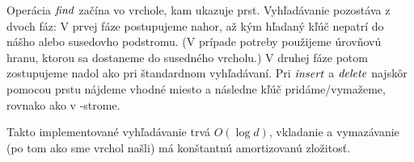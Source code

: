Operácia $\mathop{\mathit{find}}$ začína vo vrchole, kam ukazuje prst. Vyhľadávanie pozostáva z dvoch
fáz: V prvej fáze postupujeme nahor, až kým hľadaný kľúč nepatrí do nášho alebo susedovho podstromu.
(V prípade potreby použijeme úrovňovú hranu, ktorou sa dostaneme do susedného vrcholu.)
V druhej fáze potom zostupujeme nadol ako pri štandardnom vyhľadávaní.
Pri $\mathop{\mathit{insert}}$ a $\mathop{\mathit{delete}}$ najskôr pomocou prstu nájdeme vhodné miesto a následne kľúč pridáme/vymažeme,
rovnako ako v \Bp-strome. 

Takto implementované vyhľadávanie trvá $O(\log d)$, vkladanie a vymazávanie (po tom ako sme vrchol
našli) má konštantnú amortizovanú zložitosť.



% 


